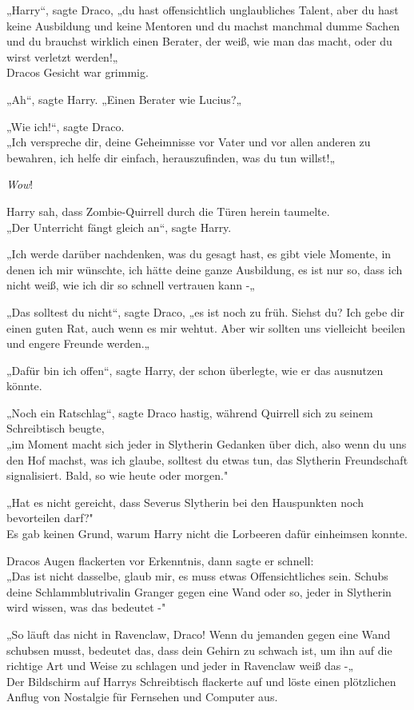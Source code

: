 {„Harry“, sagte Draco, „du hast offensichtlich unglaubliches Talent, aber du hast keine Ausbildung und keine Mentoren und du machst manchmal dumme Sachen und du brauchst wirklich einen Berater, der weiß, wie man das macht, oder du wirst verletzt werden!„\\ Dracos Gesicht war grimmig.

„Ah“, sagte Harry. „Einen Berater wie Lucius?„

„Wie ich!“, sagte Draco.\\ „Ich verspreche dir, deine Geheimnisse vor Vater und vor allen anderen zu bewahren, ich helfe dir einfach, herauszufinden, was du tun willst!„

\emph{Wow}!

Harry sah, dass Zombie-Quirrell durch die Türen herein taumelte.\\ „Der Unterricht fängt gleich an“, sagte Harry.

„Ich werde darüber nachdenken, was du gesagt hast, es gibt viele Momente, in denen ich mir wünschte, ich hätte deine ganze Ausbildung, es ist nur so, dass ich nicht weiß, wie ich dir so schnell vertrauen kann -„

„Das solltest du nicht“, sagte Draco, „es ist noch zu früh. Siehst du? Ich gebe dir einen guten Rat, auch wenn es mir wehtut. Aber wir sollten uns vielleicht beeilen und engere Freunde werden.„

„Dafür bin ich offen“, sagte Harry, der schon überlegte, wie er das ausnutzen könnte.

„Noch ein Ratschlag“, sagte Draco hastig, während Quirrell sich zu seinem Schreibtisch beugte,\\ „im Moment macht sich jeder in Slytherin Gedanken über dich, also wenn du uns den Hof machst, was ich glaube, solltest du etwas tun, das Slytherin Freundschaft signalisiert. Bald, so wie heute oder morgen."

„Hat es nicht gereicht, dass Severus Slytherin bei den Hauspunkten noch bevorteilen darf?"\\ Es gab keinen Grund, warum Harry nicht die Lorbeeren dafür einheimsen konnte.

Dracos Augen flackerten vor Erkenntnis, dann sagte er schnell:\\ „Das ist nicht dasselbe, glaub mir, es muss etwas Offensichtliches sein. Schubs deine Schlammblutrivalin Granger gegen eine Wand oder so, jeder in Slytherin wird wissen, was das bedeutet -"

„So läuft das nicht in Ravenclaw, Draco! Wenn du jemanden gegen eine Wand schubsen musst, bedeutet das, dass dein Gehirn zu schwach ist, um ihn auf die richtige Art und Weise zu schlagen und jeder in Ravenclaw weiß das -„\\ Der Bildschirm auf Harrys Schreibtisch flackerte auf und löste einen plötzlichen Anflug von Nostalgie für Fernsehen und Computer aus.

}
